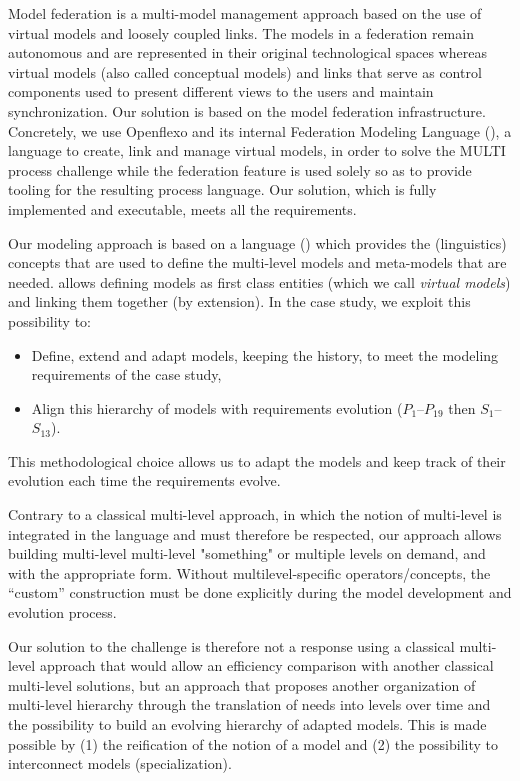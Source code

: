 Model federation is a multi-model management approach based on the use of virtual models and loosely coupled links. The models in a federation remain autonomous and are represented in their original technological spaces whereas virtual models (also called conceptual models) and links that serve as control components used to present different views to the users and maintain synchronization.
Our solution is based on the model federation infrastructure. Concretely, we use Openflexo and its internal Federation Modeling Language (\FML), a language to create, link and manage virtual models, in order to solve the MULTI process challenge while the federation feature is used solely so as to provide tooling for the resulting process language. Our solution, which is fully implemented and executable, meets all the requirements.

Our modeling approach is based on a language (\FML) which provides the (linguistics) concepts that are used to define the multi-level models and meta-models that are needed. \FML allows defining models as first class entities (which we call \emph{virtual models}) and linking them together (by extension). In the \mpc case study, we exploit this possibility to:
\begin{itemize}
    \item Define, extend and adapt models, keeping the history, to meet the %
    modeling requirements of the case study,
    \item Align this hierarchy of models with requirements evolution
      ($P_1$--$P_{19}$ then $S_1$--$S_{13}$).
\end{itemize}
This methodological choice allows us to adapt the models and keep track of their evolution each time the requirements evolve.

Contrary to a classical multi-level approach, in which the notion of
multi-level is integrated in the language and must therefore be respected, our
approach allows building multi-level{\color{red} multi-level "something" or multiple levels} on demand, and with the appropriate form.
Without multilevel-specific operators/concepts, the \enquote{custom}
construction must be done explicitly during the model development and evolution
process.

Our solution to the challenge is therefore not a response using a classical multi-level approach that would allow an efficiency comparison with another classical multi-level solutions, but an approach that proposes another organization of multi-level hierarchy through the translation of needs into levels over time and the possibility to build an evolving hierarchy of adapted models. This is made possible by (1) the reification of the notion of a model and (2) the possibility to interconnect models (specialization).%

